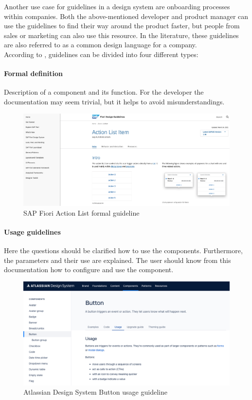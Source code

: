 Another use case for guidelines in a design system are onboarding processes within companies. Both the above-mentioned developer and product manager can use the guidelines to find their way around the product faster, but people from sales or marketing can also use this resource.  In the literature, these guidelines are also referred to as a common design language for a company.  \\
According to \citet*{vesselov_building_2019}, guidelines can be divided into four different types: 

\paragraph*{Formal definition} 
Description of a component and its function. For the developer the documentation may seem trivial, but it helps to avoid misunderstandings. \cite{vesselov_building_2019}
\begin{figure}[htbp]
\centerline{\includegraphics[width=\linewidth]{images/fiori_action-list_formal.png}}
\caption{SAP Fiori Action List formal guideline \cite{sap_fiori_action_nodate}}
\label{fiori_action_list}
\end{figure}
\paragraph*{Usage guidelines} Here the questions should be clarified how to use the components. Furthermore, the parameters and their use are explained. The user should know from this documentation how to configure and use the component. \cite{vesselov_building_2019}
\begin{figure}[htbp]
\centerline{\includegraphics[width=\linewidth]{images/atlassian_button_usage.png}}
\caption{Atlassian Design System Button usage guideline \cite{atlassian_button_nodate}}
\label{atlassian_button}
\end{figure}

